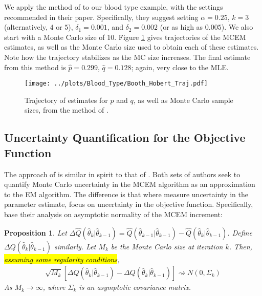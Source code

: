 \documentclass[11pt, oneside]{article}   	%
\newtheorem{proposition}{Proposition}[section]
\begin{document}
We apply the method of \citet{Boo99} to our blood type example, with the settings recommended in their paper. Specifically, they suggest setting $\alpha = 0.25$, $k = 3$ (alternatively, $4$ or $5$), $\delta_1 = 0.001$, and $\delta_2 = 0.002$ (or as high as $0.005$). We also start with a Monte Carlo size of 10. Figure \ref{fig:blood_BH_traj} gives trajectories of the MCEM estimates, as well as the Monte Carlo size used to obtain each of these estimates. Note how the trajectory stabilizes as the MC size increases. The final estimate from this method is $\hat{p} = 0.299$, $\hat{q} = 0.128$; again, very close to the MLE.



\begin{figure}
    \centering
    \caption{Trajectory of estimates for $p$ and $q$, as well as Monte Carlo sample sizes, from the method of \citeauthor{Boo99}.}
    \label{fig:blood_BH_traj}
    \texttt{[image: ../plots/Blood\_Type/Booth\_Hobert\_Traj.pdf]}   
\end{figure}




\subsection{Uncertainty Quantification for the Objective Function \citep{Caf05}}

The approach of \citet{Caf05} is similar in spirit to that of \citet{Boo99}. Both sets of authors seek to quantify Monte Carlo uncertainty in the MCEM algorithm as an approximation to the EM algorithm. The difference is that where \citeauthor{Boo99} measure uncertainty in the parameter estimate, \citeauthor{Caf05} focus on uncertainty in the objective function. Specifically, \citeauthor{Caf05} base their analysis on asymptotic normality of the MCEM increment:
%
\begin{proposition}
    \label{thm:Caf_normality}
    Let $\Delta \hat{Q}(\hat{\theta}_k|\hat{\theta}_{k-1}) = \hat{Q}(\hat{\theta}_{k-1}|\hat{\theta}_{k-1}) - \hat{Q}(\hat{\theta}_k|\hat{\theta}_{k-1})$. Define $\Delta Q(\hat{\theta}_k|\hat{\theta}_{k-1})$ similarly. Let $M_k$ be the Monte Carlo size at iteration $k$. Then, \hl{assuming some regularity conditions},
    \begin{align}
        \sqrt{M_k} \left[ \Delta \hat{Q}(\hat{\theta}_k|\hat{\theta}_{k-1}) - \Delta Q(\hat{\theta}_k|\hat{\theta}_{k-1}) \right] \rightsquigarrow N(0, \Sigma_k)
    \end{align}
    As $M_k \rightarrow \infty$, where $\Sigma_k$ is an asymptotic covariance matrix.
\end{proposition}
\end{document}
